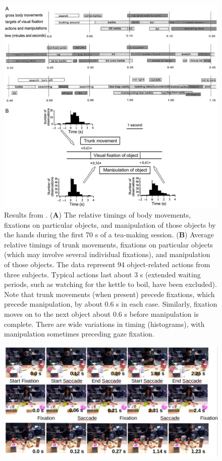 \documentclass[11pt,a4paper]{article}
\begin{document}
\begin{figure}[!ht]
\begin{center}
\includegraphics[scale=0.5]{Pictures/GazeObjectBehavior_Land.png}
\end{center}
\caption{Results from \cite{Land2009}. (\textbf{A}) The relative timings of body movements, fixations on particular objects, and manipulation of those objects by the hands during the first 70 s of a tea-making session.
(\textbf{B}) Average relative timings of trunk movements,
fixations on particular objects (which may involve several individual fixations), and manipulation of those objects. The data represent
94 object-related actions from three subjects. Typical actions last about 3 s (extended waiting periods, such as watching for the kettle to
boil, have been excluded). Note that trunk movements (when present) precede fixations, which precede manipulation, by about 0.6 s in
each case. Similarly, fixation moves on to the next object about 0.6 s before manipulation is complete. There are wide variations in timing
(histograms), with manipulation sometimes preceding gaze fixation.\label{LandResults}}
\end{figure}

\begin{figure}
\includegraphics[scale=0.4]{Pictures/MHRI_Point.png}
\end{figure}

\clearpage


\end{document}
